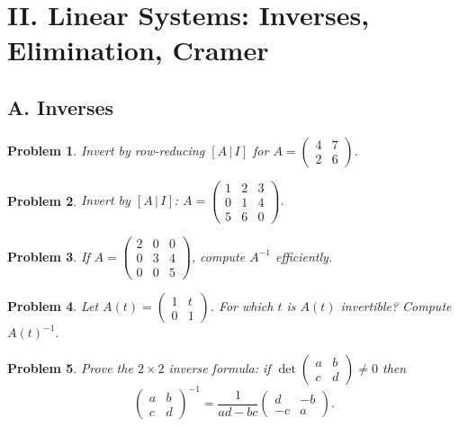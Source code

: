 \documentclass[11pt]{article}
\theoremstyle{upright}
\newtheorem{problem}{Problem}
\begin{document}
\section*{II. Linear Systems: Inverses, Elimination, Cramer}

\subsection*{A. Inverses}
\begin{problem}
Invert by row-reducing $[A\,|\,I]$ for $A=\begin{pmatrix}4&7\\2&6\end{pmatrix}$.
\end{problem}

\begin{problem}
Invert by $[A\,|\,I]$:
$A=\begin{pmatrix}1&2&3\\0&1&4\\5&6&0\end{pmatrix}$.
\end{problem}

\begin{problem}
If $A=\begin{pmatrix}2&0&0\\0&3&4\\0&0&5\end{pmatrix}$, compute $A^{-1}$ efficiently.
\end{problem}

\begin{problem}
Let $A(t)=\begin{pmatrix}1&t\\0&1\end{pmatrix}$. For which $t$ is $A(t)$ invertible? Compute $A(t)^{-1}$.
\end{problem}

\begin{problem}
Prove the $2\times 2$ inverse formula: if $\det\begin{pmatrix}a&b\\ c&d\end{pmatrix}\neq 0$ then
\[
\begin{pmatrix}a&b\\ c&d\end{pmatrix}^{-1}
=\frac{1}{ad-bc}\begin{pmatrix} d&-b\\ -c&a\end{pmatrix}.
\]
\end{problem}
\end{document}
